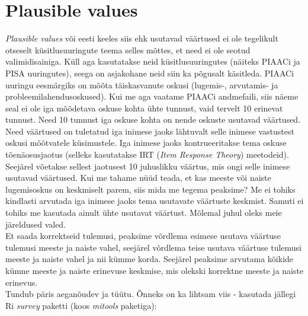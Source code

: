 \documentclass[
]{book}
\begin{document}
\hypertarget{plausible-values}{%
\section{Plausible values}\label{plausible-values}}

\emph{Plausible values} või eesti keeles siis ehk usutavad väärtused ei ole tegelikult otseselt küsitlusuuringute teema selles mõttes, et need ei ole seotud valimidisainiga. Küll aga kasutatakse neid küsitlusuuringutes (näiteks PIAACi ja PISA uuringutes), seega on asjakohane neid siin ka põgusalt käsitleda. PIAACi uuringu eesmärgiks on mõõta täiskasvanute oskusi (lugemis-, arvutamis- ja probleemilahendusoskused). Kui me aga vaatame PIAACi andmefaili, siis näeme seal ei ole iga mõõdetava oskuse kohta ühte tunnust, vaid tervelt 10 erinevat tunnust. Need 10 tunnust iga oskuse kohta on nende oskuste usutavad väärtused. Need väärtused on tuletatud iga inimese jaoks lähtuvalt selle inimese vastustest oskusi mõõtvatele küsimustele. Iga inimese jaoks kontrueeritakse tema oskuse tõenäosusjaotus (selleks kasutatakse IRT (\emph{Item Response Theory}) meetodeid). Seejärel võetakse sellest jaotusest 10 juhuslikku väärtus, mis ongi selle inimese usutavad väärtused.
Kui me tahame nüüd teada, et kas meeste või naiste lugemisoskus on keskmiselt parem, siis mida me tegema peaksime? Me ei tohiks kindlasti arvutada iga inimese jaoks tema usutavate väärtuste keskmist. Samuti ei tohiks me kasutada ainult ühte usutavat väärtust. Mõlemal juhul oleks meie järeldused valed.\\
Et saada korrektseid tulemusi, peaksime võrdlema esimese usutava väärtuse tulemusi meeste ja naiste vahel, seejärel võrdlema teise usutava väärtuse tulemusi meeste ja naiste vahel ja nii kümme korda. Seejärel peaksime arvutama kõikide kümne meeste ja naiste erinevuse keskmise, mis olekski korrektne meeste ja naiste erinevus.\\
Tundub päris aeganõudev ja tüütu. Õnneks on ka lihtsam viis - kasutada jällegi Ri \emph{survey} paketti (koos \emph{mitools} paketiga):

  
\end{document}
